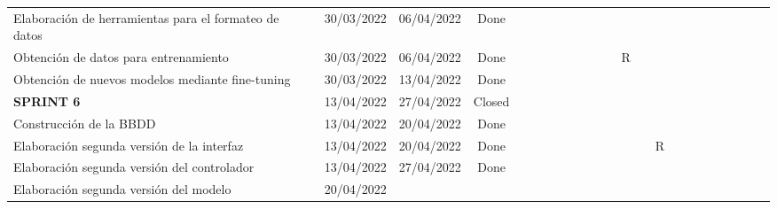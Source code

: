 \begin{landscape}
\begin{table}[h]
{\begin{tabular}{|lccc|l|l|l|l|l|l|l|l|l|l|l|l|l|l|l|l|l|l|l|}
   &
   &
   &
   &
   &
   &
   \\ \hline
\multicolumn{1}{|l|}{Elaboración de herramientas para el formateo de datos} &
  \multicolumn{1}{c|}{30/03/2022} &
  \multicolumn{1}{c|}{06/04/2022} &
  Done &
   &
   &
   &
   &
   &
   &
   &
  \cellcolor[HTML]{07BB30} &
   &
   &
   &
   &
   &
   &
   &
   &
   &
   &
   \\ \hline
\multicolumn{1}{|l|}{Obtención de datos para entrenamiento} &
  \multicolumn{1}{c|}{30/03/2022} &
  \multicolumn{1}{c|}{06/04/2022} &
  Done &
   &
   &
   &
   &
   &
   &
   &
  \cellcolor[HTML]{07BB30} &
  \multicolumn{1}{c|}{\cellcolor[HTML]{FFFFC7}R} &
   &
   &
   &
   &
   &
   &
   &
   &
   &
   \\ \hline
\multicolumn{1}{|l|}{Obtención de nuevos modelos mediante fine-tuning} &
  \multicolumn{1}{c|}{30/03/2022} &
  \multicolumn{1}{c|}{13/04/2022} &
  Done &
   &
   &
   &
   &
   &
   &
   &
  \cellcolor[HTML]{07BB30} &
  \cellcolor[HTML]{07BB30} &
   &
   &
   &
   &
   &
   &
   &
   &
   &
   \\ \hline
\multicolumn{1}{|l|}{\cellcolor[HTML]{C0C0C0}\textbf{SPRINT 6}} &
  \multicolumn{1}{c|}{\cellcolor[HTML]{C0C0C0}13/04/2022} &
  \multicolumn{1}{c|}{\cellcolor[HTML]{C0C0C0}27/04/2022} &
  \cellcolor[HTML]{C0C0C0}Closed &
   &
   &
   &
   &
   &
   &
   &
   &
   &
  \cellcolor[HTML]{A1E8A8} &
  \cellcolor[HTML]{A1E8A8} &
   &
   &
   &
   &
   &
   &
   &
   \\ \hline
\multicolumn{1}{|l|}{Construcción de la BBDD} &
  \multicolumn{1}{c|}{13/04/2022} &
  \multicolumn{1}{c|}{20/04/2022} &
  Done &
   &
   &
   &
   &
   &
   &
   &
   &
   &
  \cellcolor[HTML]{07BB30} &
   &
   &
   &
   &
   &
   &
   &
   &
   \\ \hline
\multicolumn{1}{|l|}{Elaboración segunda versión de la interfaz} &
  \multicolumn{1}{c|}{13/04/2022} &
  \multicolumn{1}{c|}{20/04/2022} &
  Done &
   &
   &
   &
   &
   &
   &
   &
   &
   &
  \cellcolor[HTML]{07BB30} &
  \multicolumn{1}{c|}{\cellcolor[HTML]{FFFFC7}R} &
   &
   &
   &
   &
   &
   &
   &
   \\ \hline
\multicolumn{1}{|l|}{Elaboración segunda versión del controlador} &
  \multicolumn{1}{c|}{13/04/2022} &
  \multicolumn{1}{c|}{27/04/2022} &
  Done &
   &
   &
   &
   &
   &
   &
   &
   &
   &
  \cellcolor[HTML]{07BB30} &
  \cellcolor[HTML]{07BB30} &
   &
   &
   &
   &
   &
   &
   &
   \\ \hline
\multicolumn{1}{|l|}{Elaboración segunda versión del modelo} &
  \multicolumn{1}{c|}{20/04/2022} &

\end{tabular}}
\end{table}
\end{landscape}
